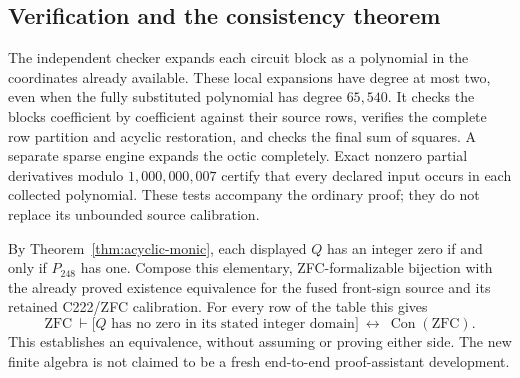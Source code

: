 \subsection{Verification and the consistency theorem}

The independent checker expands each circuit block as a polynomial in
the coordinates already available.  These local expansions have
degree at most two, even when the fully substituted polynomial has degree
$65{,}540$.  It checks the blocks coefficient by coefficient against their
source rows, verifies the complete row partition and acyclic restoration,
and checks the final sum of squares.  A separate sparse engine expands
the octic completely.  Exact nonzero partial derivatives modulo
$1{,}000{,}000{,}007$ certify that every declared input occurs
in each collected polynomial.  These tests accompany the ordinary proof;
they do not replace its unbounded source calibration.

By Theorem~\ref{thm:acyclic-monic}, each displayed $Q$ has an integer zero
if and only if $P_{248}$ has one.  Compose this elementary, ZFC-formalizable
bijection with the already proved existence equivalence for the fused
front-sign source and its retained C222/ZFC calibration.  For every row
of the table this gives
\[
 \mathrm{ZFC}\ \vdash
 \bigl[\text{$Q$ has no zero in its stated integer domain}\bigr]
 \ \longleftrightarrow\ \operatorname{Con}(\mathrm{ZFC}).
\]
This establishes an equivalence, without assuming or proving either
side.  The new finite algebra is not claimed to be a fresh end-to-end
proof-assistant development.
